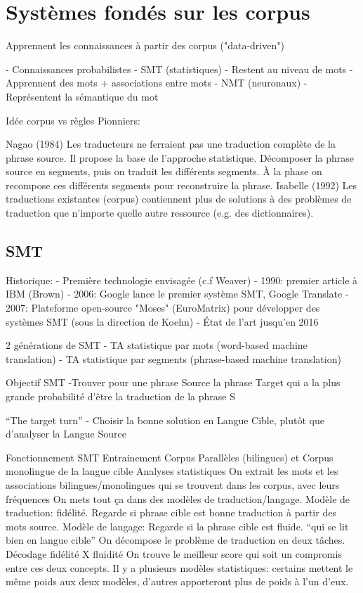 \vspace{-1.2cm}

\section{Systèmes fondés sur les corpus}
\label{sec:corpus}

Apprennent les connaissances à partir des corpus ("data-driven")

- Connaissances probabilistes
- SMT (statistiques)
    - Restent au niveau de mots
    - Apprennent des mots + associations entre mots
- NMT (neuronaux)
    - Représentent la sémantique du mot


Idée corpus vs règles
Pionniers:

Nagao (1984)
    Les traducteurs ne ferraient pas une traduction complète de la phrase source. Il propose la base de l'approche statistique. Décomposer la phrase source en segments, puis on traduit les différents segments. À la phase on recompose ces différents segments pour reconstruire la phrase.
Isabelle (1992)
    Les traductions existantes (corpus) contiennent plus de solutions à des problèmes de traduction que n'importe quelle autre ressource (e.g. des dictionnaires).


\subsection{SMT}

Historique:
    - Première technologie envisagée (c.f Weaver)
    - 1990: premier article à IBM (Brown)
    - 2006: Google lance le premier système SMT, Google Translate
    - 2007: Plateforme open-source "Moses" (EuroMatrix) pour développer des systèmes SMT (sous la direction de Koehn)
    - État de l'art jusqu'en 2016

2 générations de SMT
    - TA statistique par mots (word-based machine translation)
    - TA statistique par segments (phrase-based machine translation)

Objectif SMT
    -Trouver pour une phrase Source la phrase Target qui a la plus grande probabilité d'être la traduction de la phrase S

``The target turn''
    - Choisir la bonne solution en Langue Cible, plutôt que d'analyser la Langue Source

Fonctionnement SMT
    Entrainement
        Corpus Parallèles (bilingues) et Corpus monolingue de la langue cible
        Analyses statistiques
        On extrait les mots et les associations bilingues/monolingues qui se trouvent dans les corpus, avec leurs fréquences
        On mets tout ça dans des modèles de traduction/langage.
        Modèle de traduction: fidélité. Regarde si phrase cible est bonne traduction à partir des mots source.
        Modèle de langage: Regarde si la phrase cible est fluide. ``qui se lit bien en langue cible''
        On décompose le problème de traduction en deux tâches.
    Décodage
        fidélité X fluidité
        On trouve le meilleur score qui soit un compromis entre ces deux concepts.
        Il y a plusieurs modèles statistiques: certains mettent le même poids aux deux modèles, d'autres apporteront plus de poids à l'un d'eux.

